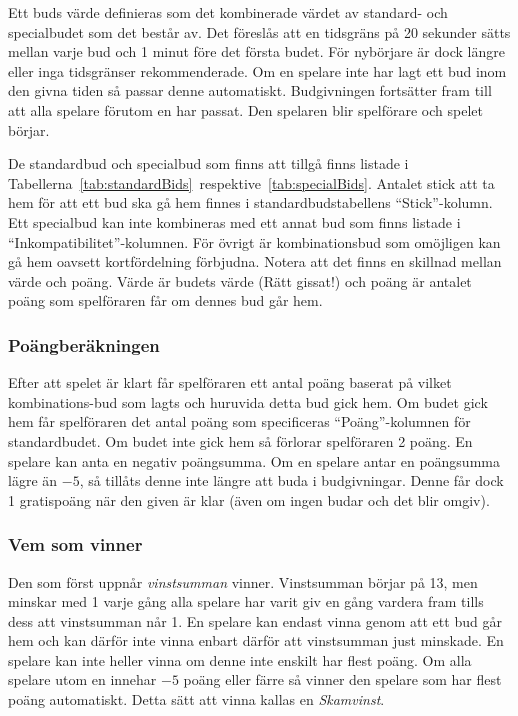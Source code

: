 \documentclass[a4paper]{article}
\begin{document}
				Ett buds värde definieras som det kombinerade värdet av standard- och specialbudet som det består av. Det föreslås att en tidsgräns på 20 sekunder sätts mellan varje bud och 1 minut före det första budet. För nybörjare är dock längre eller inga tidsgränser rekommenderade. Om en spelare inte har lagt ett bud inom den givna tiden så passar denne automatiskt. Budgivningen fortsätter fram till att alla spelare förutom en har passat. Den spelaren blir spelförare och spelet börjar.

				De standardbud och specialbud som finns att tillgå finns listade i Tabellerna~\ref{tab:standardBids}~respektive~\ref{tab:specialBids}. Antalet stick att ta hem för att ett bud ska gå hem finnes i standardbudstabellens ``Stick''-kolumn. Ett specialbud kan inte kombineras med ett annat bud som finns listade i ``Inkompatibilitet''-kolumnen. För övrigt är kombinationsbud som omöjligen kan gå hem oavsett kortfördelning förbjudna. Notera att det finns en skillnad mellan värde och poäng. Värde är budets värde (Rätt gissat!) och poäng är antalet poäng som spelföraren får om dennes bud går hem.

			\subsubsection{Poängberäkningen}
				Efter att spelet är klart får spelföraren ett antal poäng baserat på vilket kombinations-bud som lagts och huruvida detta bud gick hem. Om budet gick hem får spelföraren det antal poäng som specificeras ``Poäng''-kolumnen för standardbudet. Om budet inte gick hem så förlorar spelföraren 2 poäng. En spelare kan anta en negativ poängsumma. Om en spelare antar en poängsumma lägre än $-5$, så tillåts denne inte längre att buda i budgivningar. Denne får dock 1 gratispoäng när den given är klar (även om ingen budar och det blir omgiv).

			\subsubsection{Vem som vinner}
				\label{sec:winning}
				Den som först uppnår \emph{vinstsumman} vinner. Vinstsumman börjar på 13, men minskar med 1 varje gång alla spelare har varit giv en gång vardera fram tills dess att vinstsumman når 1. En spelare kan endast vinna genom att ett bud går hem och kan därför inte vinna enbart därför att vinstsumman just minskade. En spelare kan inte heller vinna om denne inte enskilt har flest poäng. Om alla spelare utom en innehar $-5$ poäng eller färre så vinner den spelare som har flest poäng automatiskt. Detta sätt att vinna kallas en \emph{Skamvinst}.
\end{document}
